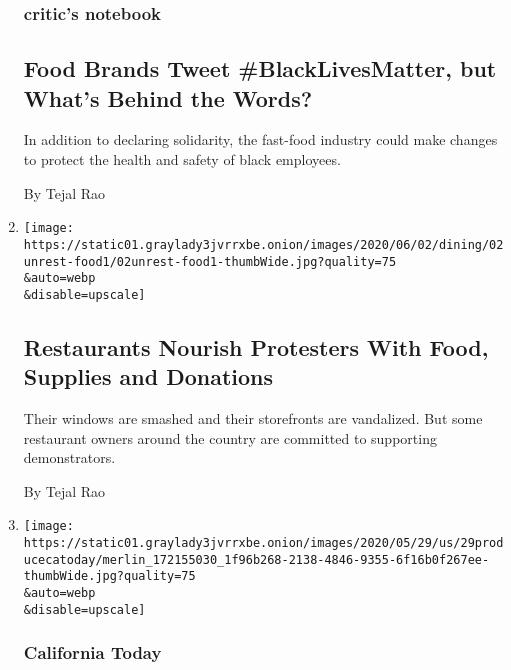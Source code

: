 \begin{enumerate}
  \hypertarget{critics-notebook-3}{%
  \subsubsection{critic's notebook}\label{critics-notebook-3}}

  \hypertarget{food-brands-tweet-blacklivesmatter-but-whats-behind-the-words}{%
  \subsection{Food Brands Tweet \#BlackLivesMatter, but What's Behind
  the
  Words?}\label{food-brands-tweet-blacklivesmatter-but-whats-behind-the-words}}

  In addition to declaring solidarity, the fast-food industry could make
  changes to protect the health and safety of black employees.

  By Tejal Rao
\item
  \href{/2020/06/02/dining/restaurant-response-floyd-protests.html}{}

  \texttt{[image: https://static01.graylady3jvrrxbe.onion/images/2020/06/02/dining/02unrest-food1/02unrest-food1-thumbWide.jpg?quality=75\\\&auto=webp\\\&disable=upscale]}

  \hypertarget{restaurants-nourish-protesters-with-food-supplies-and-donations}{%
  \subsection{Restaurants Nourish Protesters With Food, Supplies and
  Donations}\label{restaurants-nourish-protesters-with-food-supplies-and-donations}}

  Their windows are smashed and their storefronts are vandalized. But
  some restaurant owners around the country are committed to supporting
  demonstrators.

  By Tejal Rao
\item
  \href{/2020/05/29/us/california-local-produce-recipes.html}{}

  \texttt{[image: https://static01.graylady3jvrrxbe.onion/images/2020/05/29/us/29producecatoday/merlin\_172155030\_1f96b268-2138-4846-9355-6f16b0f267ee-thumbWide.jpg?quality=75\\\&auto=webp\\\&disable=upscale]}

  \hypertarget{california-today}{%
  \subsubsection{California Today}\label{california-today}}


\end{enumerate}
